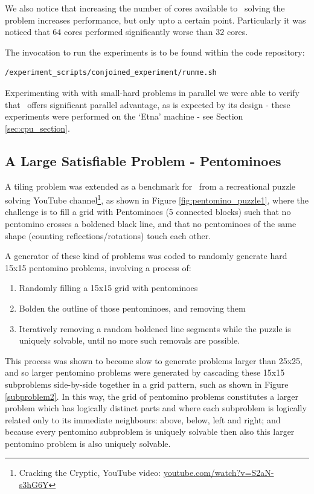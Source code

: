 \documentclass[
10pt, %
a4paper, %
oneside, %
headinclude,footinclude, %
BCOR5mm, %
]{scrartcl}
\begin{document}
We also notice that increasing the number of cores available to \dagster\ solving the problem increases performance, but only upto a certain point.
Particularly it was noticed that $64$ cores performed significantly worse than $32$ cores.

The invocation to run the experiments is to be found within the code repository:

\begin{Verbatim}[frame=single]
/experiment_scripts/conjoined_experiment/runme.sh
\end{Verbatim}

Experimenting with with small-hard problems in parallel we were able to verify that \dagster\ offers significant parallel advantage, as is expected by its design - these experiments were performed on the `Etna' machine - see Section \ref{sec:cpu_section}.






\subsection{A Large Satisfiable Problem - Pentominoes}\label{sec:pentominos}

A tiling problem was extended as a benchmark for \dagster\ from a recreational puzzle solving YouTube channel\footnote{Cracking the Cryptic, YouTube video: \url{youtube.com/watch?v=S2aN-s3hG6Y}}, as shown in Figure \ref{fig:pentomino_puzzle1}, where the challenge is to fill a grid with Pentominoes (5 connected blocks) such that no pentomino crosses a boldened black line, and that no pentominoes of the same shape (counting reflections/rotations) touch each other.



A generator of these kind of problems was coded to randomly generate hard 15x15 pentomino problems, involving a process of:
\begin{enumerate}
\item	Randomly filling a 15x15 grid with pentominoes
\item	Bolden the outline of those pentominoes, and removing them
\item	Iteratively removing a random boldened line segments while the puzzle is uniquely solvable, until no more such removals are possible.
\end{enumerate}

This process was shown to become slow to generate problems larger than 25x25, and so larger pentomino problems were generated by cascading these 15x15 subproblems side-by-side together in a grid pattern, such as shown in Figure \ref{subproblem2}.
In this way, the grid of pentomino problems constitutes a larger problem which has logically distinct parts and where each subproblem is logically related only to its immediate neighbours: above, below, left and right; and because every pentomino subproblem is uniquely solvable then also this larger pentomino problem is also uniquely solvable.
\end{document}
